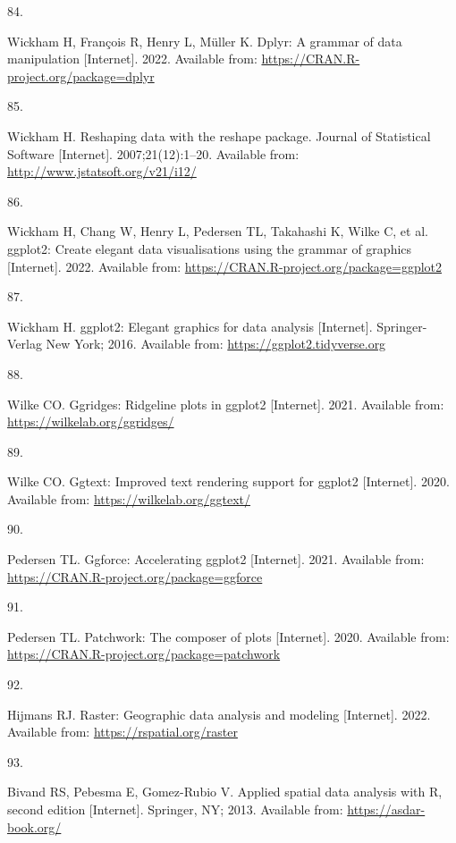 \documentclass[10pt,a4paper]{article}
\newlength{\cslhangindent}
\newlength{\csllabelwidth}
\newenvironment{CSLReferences}[2] %
{\begin{list}{}{%
	\setlength{\itemindent}{0pt}
	\setlength{\leftmargin}{0pt}
	\setlength{\parsep}{0pt}
	\ifodd #1
	\setlength{\leftmargin}{\cslhangindent}
	\setlength{\itemindent}{-1\cslhangindent}
	\fi
	\setlength{\itemsep}{#2\baselineskip}}}
{\end{list}}
\newcommand{\CSLLeftMargin}[1]{\parbox[t]{\csllabelwidth}{\strut#1\strut}}
\newcommand{\CSLRightInline}[1]{\parbox[t]{\linewidth - \csllabelwidth}{\strut#1\strut}}
\begin{document}
\begin{CSLReferences}{0}{1}
\CSLLeftMargin{84. }%
\CSLRightInline{Wickham H, François R, Henry L, Müller K. Dplyr: A grammar of data manipulation {[}Internet{]}. 2022. Available from: \url{https://CRAN.R-project.org/package=dplyr}}

\CSLLeftMargin{85. }%
\CSLRightInline{Wickham H. Reshaping data with the {reshape} package. Journal of Statistical Software {[}Internet{]}. 2007;21(12):1--20. Available from: \url{http://www.jstatsoft.org/v21/i12/}}

\CSLLeftMargin{86. }%
\CSLRightInline{Wickham H, Chang W, Henry L, Pedersen TL, Takahashi K, Wilke C, et al. ggplot2: Create elegant data visualisations using the grammar of graphics {[}Internet{]}. 2022. Available from: \url{https://CRAN.R-project.org/package=ggplot2}}

\CSLLeftMargin{87. }%
\CSLRightInline{Wickham H. ggplot2: Elegant graphics for data analysis {[}Internet{]}. Springer-Verlag New York; 2016. Available from: \url{https://ggplot2.tidyverse.org}}

\CSLLeftMargin{88. }%
\CSLRightInline{Wilke CO. Ggridges: Ridgeline plots in ggplot2 {[}Internet{]}. 2021. Available from: \url{https://wilkelab.org/ggridges/}}

\CSLLeftMargin{89. }%
\CSLRightInline{Wilke CO. Ggtext: Improved text rendering support for ggplot2 {[}Internet{]}. 2020. Available from: \url{https://wilkelab.org/ggtext/}}

\CSLLeftMargin{90. }%
\CSLRightInline{Pedersen TL. Ggforce: Accelerating ggplot2 {[}Internet{]}. 2021. Available from: \url{https://CRAN.R-project.org/package=ggforce}}

\CSLLeftMargin{91. }%
\CSLRightInline{Pedersen TL. Patchwork: The composer of plots {[}Internet{]}. 2020. Available from: \url{https://CRAN.R-project.org/package=patchwork}}

\CSLLeftMargin{92. }%
\CSLRightInline{Hijmans RJ. Raster: Geographic data analysis and modeling {[}Internet{]}. 2022. Available from: \url{https://rspatial.org/raster}}

\CSLLeftMargin{93. }%
\CSLRightInline{Bivand RS, Pebesma E, Gomez-Rubio V. Applied spatial data analysis with {R}, second edition {[}Internet{]}. Springer, NY; 2013. Available from: \url{https://asdar-book.org/}}


\end{CSLReferences}
\end{document}
